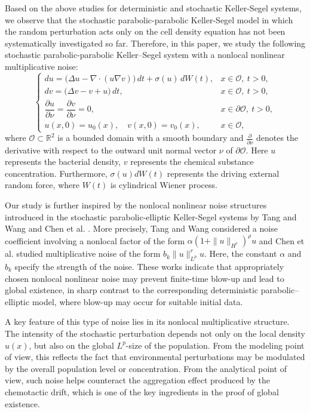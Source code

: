\documentclass[reqno, 11pt]{amsart}
\theoremstyle{definition}
\numberwithin{equation}{section} \numberwithin{lem}{section}
\numberwithin{thm}{section} \numberwithin{prop}{section}
\numberwithin{cor}{section} \numberwithin{rem}{section}
\numberwithin{defn}{section}
\begin{document}
Based on the above studies for deterministic and stochastic Keller-Segel systems,  we observe that  the stochastic parabolic-parabolic Keller-Segel model in which the random perturbation acts only on the cell density equation  has not been systematically investigated so far. Therefore, in this paper, we study the following stochastic parabolic-parabolic Keller–Segel system with a nonlocal nonlinear multiplicative noise:
\begin{equation}\label{equ1}
\begin{cases}
du = \big(\Delta u-\nabla\cdot(u\nabla v)\big)\,dt+\sigma(u)\,dW(t),
& x\in\mathcal{O},\ t>0,\\
dv = \big(\Delta v-v+u\big)\,dt,
& x\in\mathcal{O},\ t>0,\\
\dfrac{\partial u}{\partial \nu}
=
\dfrac{\partial v}{\partial \nu}
=0,
& x\in\partial\mathcal{O},\ t>0,\\
u(x,0)=u_0(x),\quad v(x,0)=v_0(x),
& x\in\mathcal{O},
\end{cases}
\end{equation}
where $\mathcal{O}\subset\mathbb{R}^2$ is a bounded domain with a  smooth boundary  and $\frac{\partial }{\partial \nu}$ denotes the derivative with respect to the outward unit normal vector $\nu$ of  $\partial\mathcal{O}$. 
 Here $u$ represents the bacterial density, $v$ represents the chemical substance concentration.  Furthermore, $\sigma(u)dW(t)$ represents the driving external random force, where $W(t)$ is cylindrical Wiener process.
 
Our study is further inspired by the nonlocal nonlinear noise structures introduced in the stochastic parabolic-elliptic Keller-Segel systems by     Tang and Wang \cite{tang2024strong} and  Chen et al. \cite{chen2025well}. More precisely, Tang and Wang considered a noise coefficient involving  a nonlocal factor of the form $\alpha(1+\|u\|_{H^r})^\rho u$  and Chen et al. studied multiplicative noise of the form $b_k \|u\|_{L^p}^ru$. Here, the constant $\alpha $ and $b_k$  specify the strength of the noise.  These works  indicate  that appropriately chosen nonlocal nonlinear noise may prevent finite-time blow-up and lead to global existence, in sharp contrast to the corresponding deterministic parabolic–elliptic model, where blow-up may occur for suitable initial data. 

A key feature of this type of noise lies in its nonlocal multiplicative structure. The intensity of the stochastic perturbation depends not only  on the local density $u(x)$, but also on the global $L^p$-size of the population. From the modeling point of view, this reflects the fact that environmental perturbations may be modulated by the overall population level or concentration.
From the analytical point of view,  such noise helps counteract the aggregation effect produced by the chemotactic drift, which is one of the key ingredients in the proof of global existence. 
 
\end{document}
